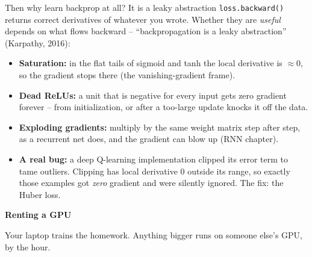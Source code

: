 \documentclass[aspectratio=43]{beamer}
\begin{document}
\begin{frame}{Then why learn backprop at all? It is a leaky abstraction}
  \small
  \texttt{loss.backward()} returns correct derivatives of whatever you wrote. Whether they are
  \emph{useful} depends on what flows backward -- ``backpropagation is a leaky abstraction''
  (Karpathy, 2016):
  \vfill
  \begin{itemize}\footnotesize
    \item \textbf{Saturation:} in the flat tails of sigmoid and tanh the local derivative is
      $\approx 0$, so the gradient stops there (the vanishing-gradient frame).
    \item \textbf{Dead ReLUs:} a unit that is negative for every input gets zero gradient forever --
      from initialization, or after a too-large update knocks it off the data.
    \item \textbf{Exploding gradients:} multiply by the same weight matrix step after step, as a
      recurrent net does, and the gradient can blow up (RNN chapter).
    \item \textbf{A real bug:} a deep Q-learning implementation clipped its error term to tame
      outliers. Clipping has local derivative $0$ outside its range, so exactly those examples got
      \emph{zero} gradient and were silently ignored. The fix: the Huber loss.
  \end{itemize}
  \vfill
\end{frame}

\begin{frame}[plain]
  \vfill
  \begin{center}
    {\Large\color{popblue}\textbf{Renting a GPU}}\\[0.9em]
    \begin{minipage}{0.82\textwidth}\centering\small
      Your laptop trains the homework. Anything bigger runs on someone else's GPU, by the hour.
    \end{minipage}
  \end{center}
  \vfill
\end{frame}
\end{document}
